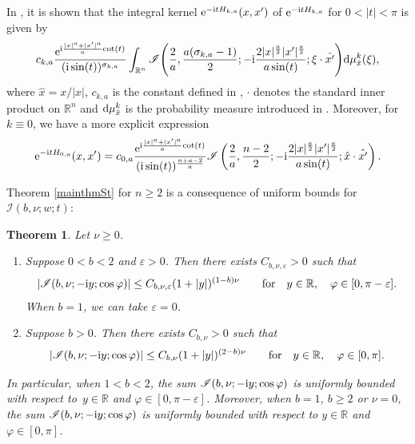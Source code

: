 \documentclass[10pt,a4paper]{amsart}
\numberwithin{equation}{section}
\newtheorem{Theorem}{Theorem}[section]
\def\R{\mathbb{R}}%
\def\e{\varepsilon}
\def\f{\varphi}
\def\m{\mu}
\def\n{\nu}
\def\x{\xi}
\newcommand{\sI}{\mathscr{I}}
\begin{document}
In \cite[Theorem C, equations (4.50) and (4.52)]{BKO}, it is shown that the integral kernel ${\rm e}^{-{\rm i}tH_{k,a}}(x,\allowbreak x')$ of ${\rm e}^{-{\rm i}tH_{k,a}}$ for $0<|t|<\pi$ is given by
\begin{align}\label{intkergen}
c_{k,a}\frac{{\rm e}^{{\rm i}\frac{|x|^a+|x'|^a}{a}\mathrm{cot}(t)} }{({\rm i}\sin (t))^{\sigma_{k,a}}} \int_{\R^n}\sI\Bigg(\frac{2}{a},\frac{a(\sigma_{k,a}-1)}{2}; -{\rm i}\frac{2|x|^{\frac{a}{2}}|x'|^{\frac{a}{2}} }{a\sin(t)}; \x\cdot \hat{x'}\Bigg){\rm d}\m_{\hat{x}}^k(\x),
\end{align}
where $\hat{x}=x/|x|$, $c_{k,a}$ is the constant defined in \cite[equation~(1.6)]{BKO}, $\cdot $ denotes the standard inner product on $\R^n$ and ${\rm d}\m_{\hat{x}}^{k}$ is the probability measure introduced in \cite[equation~(2.5)]{BKO}. Moreover, for $k\equiv 0$, we have a more explicit expression
\begin{align}\label{intker0}
{\rm e}^{-{\rm i}tH_{0,a}}(x,x')=c_{0,a}\frac{{\rm e}^{{\rm i}\frac{|x|^a+|x'|^a}{a}\mathrm{cot}(t)} }{({\rm i}\sin (t))^{\frac{n+a-2}{a}}} \sI\left(\frac{2}{a},\frac{n-2}{2}; -{\rm i}\frac{2|x|^{\frac{a}{2}}|x'|^{\frac{a}{2}} }{a\sin(t)}; \hat{x}\cdot \hat{x'}\right).
\end{align}

Theorem \ref{mainthmSt} for $n\geq 2$ is a consequence of uniform bounds for $\sI(b,\nu;w;t)$:


\begin{Theorem}\label{keythm}
Let $\n\geq 0$.
\begin{enumerate}\itemsep=0pt
\item[$(i)$]
Suppose $0<b<2$ and $\e>0$. Then there exists $C_{b,\n,\e}>0$ such that
\begin{align*}
|\sI(b,\nu;-{\rm i}y;\cos\f)|\leq C_{b,\n,\e}(1+|y|)^{(1-b)\n}\qquad \text{for}\quad y\in \R,\quad \f\in [0,\pi-\e].
\end{align*}
When $b=1$, we can take $\e=0$.

\item[$(ii)$]
Suppose $b>0$. Then there exists $C_{b,\n}>0$ such that
\begin{align*}
|\sI(b,\nu;-{\rm i}y;\cos\f)|\leq C_{b,\n}(1+|y|)^{(2-b)\n}\qquad \text{for}\quad y\in \R,\quad \f\in [0,\pi].
\end{align*}
\end{enumerate}
In particular, when $1< b< 2$, the sum $\sI(b,\nu;-{\rm i}y;\cos\f)$ is uniformly bounded with respect to~${y\in \R}$ and $\f\in [0,\pi-\e]$. Moreover, when $b=1$, $b\geq 2$ or $\nu=0$, the sum $\sI(b,\nu;-{\rm i}y;\cos\f)$ is uniformly bounded with respect to $y\in \R$ and $\f\in [0,\pi]$.
\end{Theorem}
\end{document}
